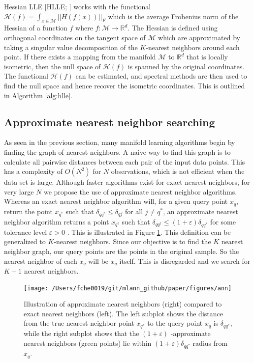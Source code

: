 \documentclass[11pt,a4paper,]{article}
\begin{document}
Hessian LLE {[}HLLE; \textcite{Donoho2003-am}{]} works with the functional \(\mathcal{H}(f)=\int_{x\in\mathcal{M}}||H(f(x))||_F\) which is the average Frobenius norm of the Hessian of a function \(f\) where \(f:\mathcal{M}\rightarrow\mathbb{R}^d\). The Hessian is defined using orthogonal coordinates on the tangent space of \(\mathcal{M}\) which are approximated by taking a singular value decomposition of the \(K\)-nearest neighbors around each point. If there exists a mapping from the manifold \(\mathcal{M}\) to \(\mathbb{R}^d\) that is locally isometric, then the null space of \(\mathcal{H}(f)\) is spanned by the original coordinates. The functional \(\mathcal{H}(f)\) can be estimated, and spectral methods are then used to find the null space and hence recover the isometric coordinates. This is outlined in Algorithm \ref{alg:hlle}.

\hypertarget{ann}{%
\subsection{Approximate nearest neighbor searching}\label{ann}}

As seen in the previous section, many manifold learning algorithms begin by finding the graph of nearest neighbors. A naive way to find this graph is to calculate all pairwise distances between each pair of the input data points. This has a complexity of \(O(N^2)\) for \(N\) observations, which is not efficient when the data set is large. Although faster algorithms exist for exact nearest neighbors, for very large \(N\) we propose the use of approximate nearest neighbor algorithms. Whereas an exact nearest neighbor algorithm will, for a given query point \(x_q\), return the point \(x_{q^*}\) such that \(\delta_{q{q^*}} \leq \delta_{qj}\) for all \(j\neq q^*\), an approximate nearest neighbor algorithm returns a point \(x_{q^\dagger}\) such that \(\delta_{q{q^\dagger}} \leq (1+\varepsilon) \delta_{q{q^*}}\) for some tolerance level \(\varepsilon > 0\) \autocite{Arya1998-bv}. This is illustrated in Figure \ref{fig:ann}. This definition can be generalized to \(K\)-nearest neighbors. Since our objective is to find the \(K\) nearest neighbor graph, our query points are the points in the original sample. So the nearest neighbor of each \(x_q\) will be \(x_q\) itself. This is disregarded and we search for \(K+1\) nearest neighbors.

\begin{figure}

{\centering \texttt{[image: /Users/fche0019/git/mlann\_github/paper/figures/ann]} 

}

\caption{Illustration of approximate nearest neighbors (right) compared to exact nearest neighbors (left). The left subplot shows the distance from the true nearest neighbor point $x_{q^*}$ to the query point $x_q$ is $\delta_{q{q^*}}$, while the right subplot shows that the $(1+\varepsilon)$ -approximate nearest neighbors (green points) lie within $(1+\varepsilon) \delta_{q{q^*}}$ radius from $x_q$. }\label{fig:ann}
\end{figure}
\end{document}
